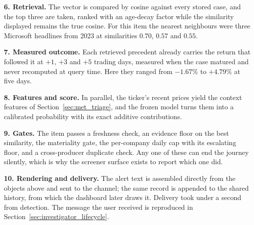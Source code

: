 \textbf{6. Retrieval.} The vector is compared by cosine against every stored case, and the top three
are taken, ranked with an age-decay factor while the similarity displayed remains the true cosine. For
this item the nearest neighbours were three Microsoft headlines from 2023 at similarities $0.70$,
$0.57$ and $0.55$.

\textbf{7. Measured outcome.} Each retrieved precedent already carries the return that followed it at
$+1$, $+3$ and $+5$ trading days, measured when the case matured and never recomputed at query time.
Here they ranged from $-1.67\%$ to $+4.79\%$ at five days.

\textbf{8. Features and score.} In parallel, the ticker's recent prices yield the context features of
Section~\ref{sec:met_triage}, and the frozen model turns them into a calibrated probability with its
exact additive contributions.

\textbf{9. Gates.} The item passes a freshness check, an evidence floor on the best similarity, the
materiality gate, the per-company daily cap with its escalating floor, and a cross-producer duplicate
check. Any one of these can end the journey silently, which is why the screener surface exists to
report which one did.

\textbf{10. Rendering and delivery.} The alert text is assembled directly from the objects above and
sent to the channel; the same record is appended to the shared history, from which the dashboard later
draws it. Delivery took under a second from detection. The message the user received is reproduced in
Section~\ref{sec:investigator_lifecycle}.


